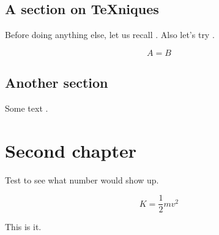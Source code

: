 \documentclass[noocg]{wwwnotes2}
\begin{document}
\section{A section on \TeX{}niques}

Before doing anything else, let us recall . Also let's try .

\lipsum[2]

\begin{equation}
	A = B
\end{equation}

\lipsum[3-8]



\section{Another section}

\lipsum[5-9]

Some text \cite{Wong2009}.


\chapter{Second chapter}

Test \theequation to see what number would show up.

\lipsum[10-23]

\begin{equation}
K = \frac12 mv^2
\end{equation}

This is it.


\cleardoublepage
\printbibliography[heading=bibintoc]
\end{document}
